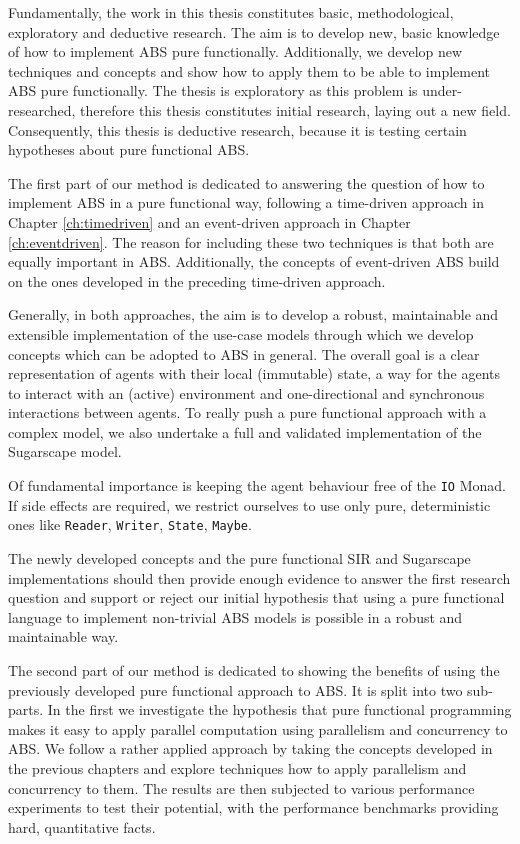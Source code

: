 Fundamentally, the work in this thesis constitutes basic, methodological, exploratory and deductive research. The aim is to develop new, basic knowledge of how to implement ABS pure functionally. Additionally, we develop new techniques and concepts and show how to apply them to be able to implement ABS pure functionally. The thesis is exploratory as this problem is under-researched, therefore this thesis constitutes initial research, laying out a new field. Consequently, this thesis is deductive research, because it is testing certain hypotheses about pure functional ABS.

\medskip

The first part of our method is dedicated to answering the question of how to implement ABS in a pure functional way, following a time-driven approach in Chapter \ref{ch:timedriven} and an event-driven approach in Chapter \ref{ch:eventdriven}. The reason for including these two techniques is that both are equally important in ABS. Additionally, the concepts of event-driven ABS build on the ones developed in the preceding time-driven approach.

Generally, in both approaches, the aim is to develop a robust, maintainable and extensible implementation of the use-case models through which we develop concepts which can be adopted to ABS in general. The overall goal is a clear representation of agents with their local (immutable) state, a way for the agents to interact with an (active) environment and one-directional and synchronous interactions between agents. To really push a pure functional approach with a complex model, we also undertake a full and validated implementation of the Sugarscape model.

Of fundamental importance is keeping the agent behaviour free of the \texttt{IO} Monad. If side effects are required, we restrict ourselves to use only pure, deterministic ones like \texttt{Reader}, \texttt{Writer}, \texttt{State}, \texttt{Maybe}.

The newly developed concepts and the pure functional SIR and Sugarscape implementations should then provide enough evidence to answer the first research question and support or reject our initial hypothesis that using a pure functional language to implement non-trivial ABS models is possible in a robust and maintainable way.

\medskip

The second part of our method is dedicated to showing the benefits of using the previously developed pure functional approach to ABS. It is split into two sub-parts. In the first we investigate the hypothesis that pure functional programming makes it easy to apply parallel computation using parallelism and concurrency to ABS. We follow a rather applied approach by taking the concepts developed in the previous chapters and explore techniques how to apply parallelism and concurrency to them. The results are then subjected to various performance experiments to test their potential, with the performance benchmarks providing hard, quantitative facts.

